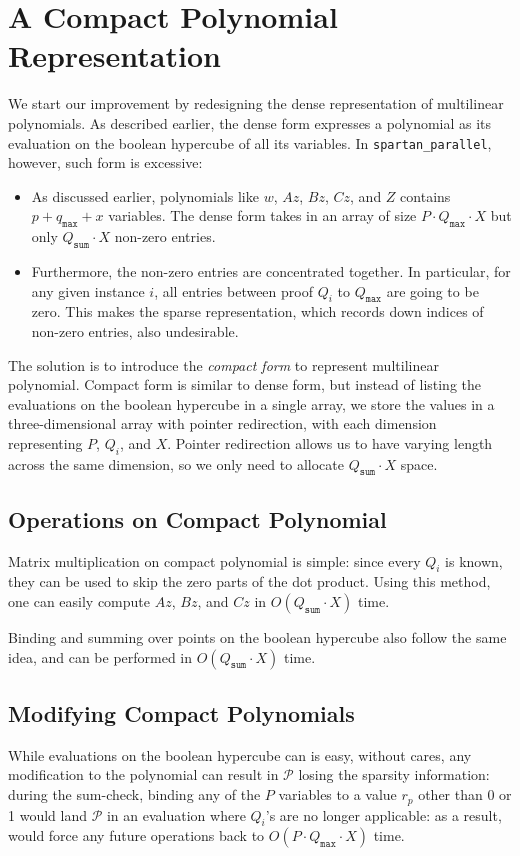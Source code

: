 \documentclass{article}
\newcommand{\code}{\texttt}
\newcommand{\Qsum}{Q_{\mathtt{sum}}}
\newcommand{\Qmax}{Q_{\mathtt{max}}}
\newcommand{\qmax}{q_{\mathtt{max}}}
\renewcommand{\P}{\mathcal{P}}
\begin{document}
\section{A Compact Polynomial Representation}\label{reduce-time}
We start our improvement by redesigning the dense representation of multilinear polynomials. As described earlier, the dense form expresses a polynomial as its evaluation on the boolean hypercube of all its variables. In \code{spartan\_parallel}, however, such form is excessive:
\begin{itemize}
    \item As discussed earlier, polynomials like $w$, $Az$, $Bz$, $Cz$, and $Z$ contains $p + \qmax + x$ variables. The dense form takes in an array of size $P\cdot \Qmax \cdot X$ but only $\Qsum\cdot X$ non-zero entries.
    \item Furthermore, the non-zero entries are concentrated together. In particular, for any given instance $i$, all entries between proof $Q_i$ to $\Qmax$ are going to be zero. This makes the sparse representation, which records down indices of non-zero entries, also undesirable.
\end{itemize}
The solution is to introduce the \emph{compact form} to represent multilinear polynomial. Compact form is similar to dense form, but instead of listing the evaluations on the boolean hypercube in a single array, we store the values in a three-dimensional array with pointer redirection, with each dimension representing $P$, $Q_i$, and $X$. Pointer redirection allows us to have varying length across the same dimension, so we only need to allocate $\Qsum\cdot X$ space.

\subsection{Operations on Compact Polynomial}
Matrix multiplication on compact polynomial is simple: since every $Q_i$ is known, they can be used to skip the zero parts of the dot product. Using this method, one can easily compute $Az$, $Bz$, and $Cz$ in $O(\Qsum\cdot X)$ time.

Binding and summing over points on the boolean hypercube also follow the same idea, and can be performed in $O(\Qsum\cdot X)$ time.

\subsection{Modifying Compact Polynomials}
While evaluations on the boolean hypercube can is easy, without cares, any modification to the polynomial can result in $\P$ losing the sparsity information: during the sum-check, binding any of the $P$ variables to a value $r_p$ other than 0 or 1 would land $\P$ in an evaluation where $Q_i$'s are no longer applicable: as a result, would force any future operations back to $O(P\cdot \Qmax\cdot X)$ time.
\end{document}
